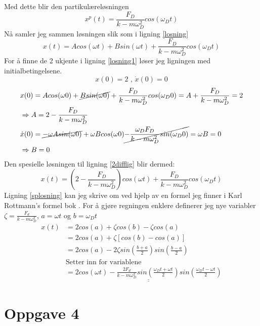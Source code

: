 \documentclass[norsk,a4paper,12pt]{article}
\begin{document}
Med dette blir den partikulæreløsningen 
\begin{equation}
x^p(t) = \frac{F_D}{k-m\omega_D^2}cos(\omega_Dt)
\label{partik}
\end{equation}
Nå samler jeg sammen løsningen slik som i ligning \vref{losning}
\begin{equation}
x(t) = Acos(\omega t) + Bsin(\omega t) + \frac{F_D}{k-m\omega_D^2}cos(\omega_Dt)
\label{losning1}
\end{equation}
For å finne de 2 ukjente i ligning \vref{losning1} løser jeg ligningen med initialbetingelsene.
$$
x(0) = 2 \text{ , } \dot{x}(0) = 0
$$
\begin{align*}
&x(0) = Acos(\omega 0) + \cancel{Bsin(\omega 0)} + \frac{F_D}{k-m\omega_D^2}cos(\omega_D0) =A + \frac{F_D}{k-m\omega_D^2} = 2\\
&\Rightarrow A = 2-\frac{F_D}{k-m\omega_D^2}\\
&\dot{x}(0) = \cancel{-\omega Asin(\omega 0)} + \omega Bcos(\omega 0) \cancel{- \frac{\omega_DF_D}{k-m\omega_D^2}sin(\omega_D0)} =\omega B = 0\\
&\Rightarrow B = 0
\end{align*}
Den spesielle løsningen til ligning \vref{2difflig} blir dermed:
\begin{equation}
x(t) = \left(2-\frac{F_D}{k-m\omega_D^2}\right)cos(\omega t) +  \frac{F_D}{k-m\omega_D^2}cos(\omega_Dt)
\label{splosning}
\end{equation}
Ligning \vref{splosning} kan jeg skrive om ved hjelp av en formel jeg finner i Karl Rottmann's formel bok \citep[s. 88]{rottmann}. For å gjøre regningen enklere definerer jeg nye variabler $\zeta = \frac{F_d}{k-m\omega_D^2}$, $a=\omega t $ og $b =\omega_Dt $ 
\begin{align*}
x(t) &= 2cos(a) + \zeta cos(b)- \zeta cos(a) \\
&= 2cos(a) + \zeta[cos(b)- cos(a) ]\\
&=2cos(a) -2\zeta sin\left(\frac{b+a}{2}\right)sin\left(\frac{b-a}{2}\right)\\
&\text{Setter inn for variablene}\\
&= \underline{\underline{2cos(\omega t ) -\frac{2F_d}{k-m\omega_D^2} sin\left(\frac{\omega_Dt+\omega t }{2}\right)sin\left(\frac{\omega_Dt-\omega t }{2}\right)}}
\end{align*}


\section{Oppgave 4}
\end{document}

